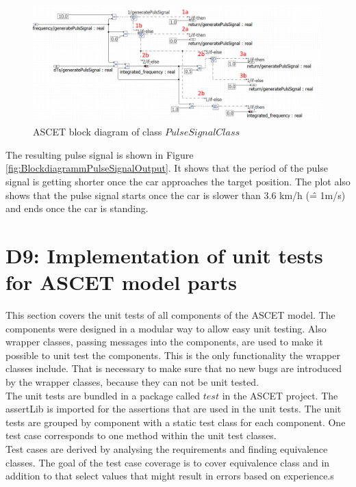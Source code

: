 \begin{figure}[H]
\centering
\includegraphics[width=1\textwidth]{images/Blockdiagramm_PulseSignalClassAnno.png}
\caption{ASCET block diagram of class $PulseSignalClass$}
\label{fig:BlockdiagrammPulseSignal}
\end{figure}

The resulting pulse signal is shown in Figure \ref{fig:BlockdiagrammPulseSignalOutput}. It shows that the period of the pulse signal is getting shorter once the car approaches the target position. The plot also shows that the pulse signal starts once the car is slower than 3.6 km/h (\^= 1m/s) and ends once the car is standing. 


\chapter{D9: Implementation of unit tests for ASCET model parts}\label{cha:D9}
This section covers the unit tests of all components of the ASCET model.
The components were designed in a modular way to allow easy unit testing.
Also wrapper classes, passing messages into the components, are used to make it possible to unit test the components.
This is the only functionality the wrapper classes include.
That is necessary to make sure that no new bugs are introduced by the wrapper classes, because they can not be unit tested.\\
The unit tests are bundled in a package called $test$ in the ASCET project. The assertLib is imported for the assertions that are used in the unit tests. The unit tests are grouped by component with a static test class for each component. One test case corresponds to one method within the unit test classes.\\

Test cases are derived by analysing the requirements and finding equivalence classes.
The goal of the test case coverage is to cover equivalence class and in addition to that select values that might result in errors based on experience.s

